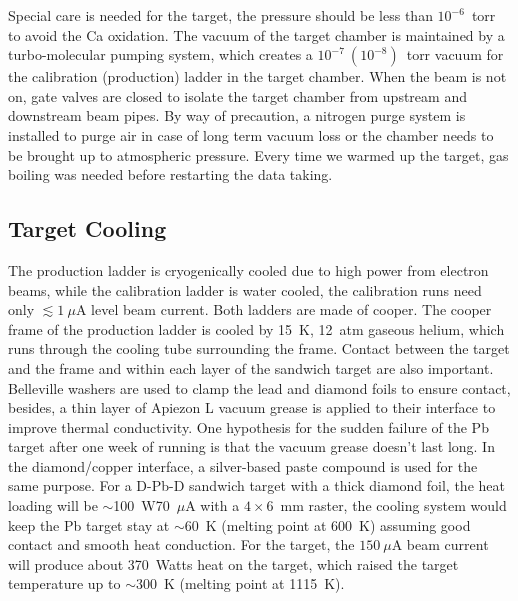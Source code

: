 Special care is needed for the \Ca target, the pressure should be less than $10^{-6}$~torr
to avoid the Ca oxidation. The vacuum of the target chamber is maintained by a 
turbo-molecular pumping system, which creates a $10^{-7}\ (10^{-8})$~torr vacuum 
for the calibration (production) ladder in the target chamber. When the beam is
not on, gate valves are closed to isolate the target chamber from upstream and 
downstream beam pipes. By way of precaution, a nitrogen purge system is 
installed to purge air in case of long term vacuum loss or the chamber needs
to be brought up to atmospheric pressure.
Every time we warmed up the \Ca target, gas boiling was needed before restarting 
the data taking.

\subsection{Target Cooling}
The production ladder is cryogenically cooled due to high power from electron beams,
while the calibration ladder is water cooled, the calibration runs need only
$\lesssim 1\ \mu$A level beam current. Both ladders are made of cooper.
The cooper frame of the production ladder is cooled by 15~K, 12~atm gaseous helium, 
which runs through the cooling tube surrounding the frame.
Contact between the target and the frame and within each layer of the \Pb sandwich
target are also important. Belleville washers are used to clamp the lead and 
diamond foils to ensure contact, besides, 
a thin layer of Apiezon L vacuum grease is applied to their interface to improve 
thermal conductivity. One hypothesis for the sudden failure of the Pb target after
one week of running is that the vacuum grease doesn't last long.
In the diamond/copper interface, a silver-based paste compound is used for the same purpose.
For a D-Pb-D sandwich target with a thick diamond foil, the heat loading will be $\sim$100~W\@70~$\mu$A
with a $4\times 6$~mm raster, the cooling system would keep the Pb target stay at
$\sim60$~K (melting point at $600$~K) assuming good contact and smooth heat
conduction. For the \Ca target, the $150\ \mu$A beam current will produce 
about 370~Watts heat on the target, which raised the target temperature 
up to $\sim300$~K (melting point at 1115~K).


